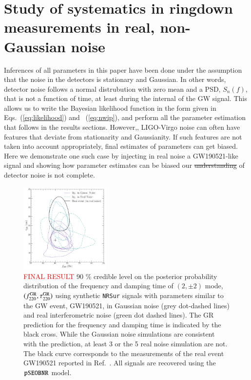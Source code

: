 \section{Study of systematics in ringdown measurements in real, non-Gaussian noise}\label{sec:noise_systematics}


Inferences of all parameters in this paper have been done under the
assumption that the noise in the detectors is stationary and
Gaussian. In other words, detector noise follows a normal distrubution
with zero mean and a PSD, $S_n(f)$, that is not a function of time, at
least during the internal of the GW signal. This
allows us to write the Bayesian likelihood function in the form given
in Eqs.~(\ref{eq:likelihood}) and ~(\ref{eq:nwip}), and perform all the
parameter estimation that follows in the results sections. However,,
LIGO-Virgo noise can often have features that deviate from
stationarity and Gaussianity. If such features are not taken into
account appropriately, final estimates of parameters can get
biased. Here we demonstrate one such case by injecting in real noise a
GW190521-like signal and showing how parameter estimates can be biased
 our \sout{understanding}  of detector noise is not complete.

\begin{figure}
\begin{center}
        \includegraphics[width=0.4\textwidth]{figures/S190521g_swinjs.png}
        \caption{\textcolor{red}{FINAL RESULT} 90 \% credible level on the posterior probability distribution of the frequency and damping time of $(2,\pm 2)$ mode, $(f ^{\text{GR}}_{\text{220}}, \tau ^{\text{GR}}_{\text{220}})$ using synthetic \texttt{NRSur} signals with parameters similar to the GW event, GW190521, in Gaussian noise (grey dot-dashed lines) and real interferometric noise (green dot dashed lines). The GR prediction for the frequency and damping time is indicated by the black cross. While the Gaussian noise simulations are consistent with the prediction, at least 3 or the 5 real noise simulation are not. The black curve corresponds to the measurements of the real event GW190521 reported in Ref.~\cite{Abbott:2020jks}. All signals are recovered using the $\texttt{pSEOBNR}$ model.}
        \label{fig:21g_systematics}
\end{center}
\end{figure}

